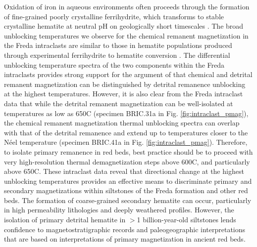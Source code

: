 \documentclass[11pt,letterpaper]{article}
\begin{document}
Oxidation of iron in aqueous environments often proceeds through the formation of fine-grained poorly crystalline ferrihydrite, which transforms to stable crystalline hematite at neutral pH on geologically short timescales \citep{Cudennec2006a}. The broad unblocking temperatures we observe for the chemical remanent magnetization in the Freda intraclasts are similar to those in hematite populations produced through experimental ferrihydrite to hematite conversion \citep{Jiang2015a}. The differential unblocking temperature spectra of the two components within the Freda intraclasts provides strong support for the argument of \cite{Jiang2015a} that chemical and detrital remanent magnetization can be distinguished by detrital remanence unblocking at the highest temperatures. However, it is also clear from the Freda intraclast data that while the detrital remanent magnetization can be well-isolated at temperatures as low as 650\textdegree C (specimen BRIC.31a in Fig. \ref{fig:intraclast_pmag}), the chemical remanent magnetization thermal unblocking spectra can overlap with that of the detrital remanence and extend up to temperatures closer to the N\'eel temperature (specimen BRIC.41a in Fig. \ref{fig:intraclast_pmag}). Therefore, to isolate primary remanence in red beds, best practice should be to proceed with very high-resolution thermal demagnetization steps above 600\textdegree C, and particularly above 650\textdegree C. These intraclast data reveal that directional change at the highest unblocking temperatures provides an effective means to discriminate primary and secondary magnetizations within siltstones of the Freda formation and other red beds. The formation of coarse-grained secondary hematite can occur, particularly in high permeability lithologies and deeply weathered profiles. However, the isolation of primary detrital hematite in $>$1 billion-year-old siltstones lends confidence to magnetostratigraphic records and paleogeographic interpretations that are based on interpretations of primary magnetization in ancient red beds. 


\end{document}
